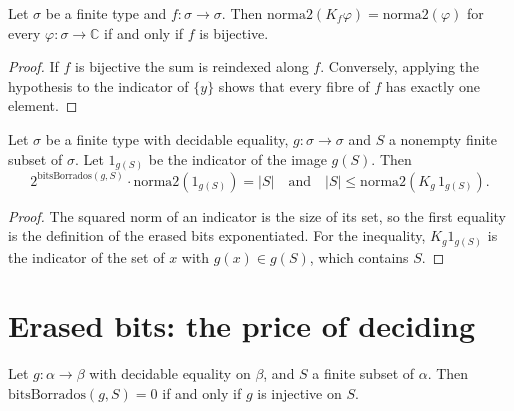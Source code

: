 \begin{theorem}
  \label{thm:dynamics-koopman-isometry}
  \leanok
  Let $\sigma$ be a finite type and $f : \sigma \to \sigma$. Then
  $\mathrm{norma2}(K_f \varphi) = \mathrm{norma2}(\varphi)$ for every $\varphi : \sigma \to \mathbb{C}$
  if and only if $f$ is bijective.
  \own{}
\end{theorem}

\begin{proof}
  \leanok
  If $f$ is bijective the sum is reindexed along $f$. Conversely, applying the hypothesis to the
  indicator of $\{y\}$ shows that every fibre of $f$ has exactly one element.
\end{proof}

\begin{theorem}
  \label{thm:dynamics-koopman-erasure}
  \leanok
  Let $\sigma$ be a finite type with decidable equality, $g : \sigma \to \sigma$ and $S$ a nonempty
  finite subset of $\sigma$. Let $1_{g(S)}$ be the indicator of the image $g(S)$. Then
  \[
    2^{\mathrm{bitsBorrados}(g, S)} \cdot \mathrm{norma2}(1_{g(S)}) = |S|
    \quad\text{and}\quad
    |S| \le \mathrm{norma2}(K_g\, 1_{g(S)}).
  \]
  \own{}
\end{theorem}

\begin{proof}
  \leanok
  The squared norm of an indicator is the size of its set, so the first equality is the definition
  of the erased bits exponentiated. For the inequality, $K_g 1_{g(S)}$ is the indicator of the set
  of $x$ with $g(x) \in g(S)$, which contains $S$.
\end{proof}

\section{Erased bits: the price of deciding}
\label{sec:dynamics-erasing}

\begin{theorem}
  \label{thm:dynamics-erased-zero}
  \leanok
  Let $g : \alpha \to \beta$ with decidable equality on $\beta$, and $S$ a finite subset of
  $\alpha$. Then $\mathrm{bitsBorrados}(g, S) = 0$ if and only if $g$ is injective on $S$.
  \own{}
\end{theorem}

